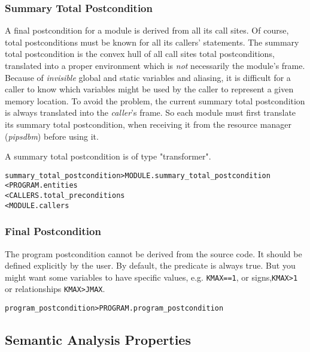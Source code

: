 \documentclass[a4paper]{report}
\newenvironment{PipsMake}{\begin{alltt}}{\end{alltt}}
\begin{document}
\subsubsection{Summary Total Postcondition}

A final postcondition for a module is derived from all its call
sites. Of course, total postconditions must be known for all its callers'
statements.  The summary total postcondition is the convex hull of all call
sites total postconditions, translated into a proper environment which is {\em
not} necessarily the module's frame. Because of {\em invisible} global
and static variables and aliasing, it is difficult for a caller to know which
variables might be used by the caller to represent a given memory
location. To avoid the problem, the current summary total postcondition is
always translated into the {\em caller}'s frame. So each module must
first translate its summary total postcondition, when receiving it from the
resource manager ({\em pipsdbm}) before using it.

A summary total postcondition is of type "transformer".

\begin{PipsMake}
summary_total_postcondition            > MODULE.summary_total_postcondition
        < PROGRAM.entities
        < CALLERS.total_preconditions
        < MODULE.callers
\end{PipsMake}

\subsubsection{Final Postcondition}
\label{subsubsection-final-postcondition}

The program postcondition cannot be derived from the source code. It
should be defined explicitly by the user. By default, the predicate is
always true. But you might want some variables to have specific values,
e.g. \verb+KMAX==1+, or signs,\verb+KMAX>1+ or relationships
\verb+KMAX>JMAX+.

\begin{PipsMake}
program_postcondition     > PROGRAM.program_postcondition
\end{PipsMake}

\subsection{Semantic Analysis Properties}
\label{subsection-semantic-analysis}
\end{document}
